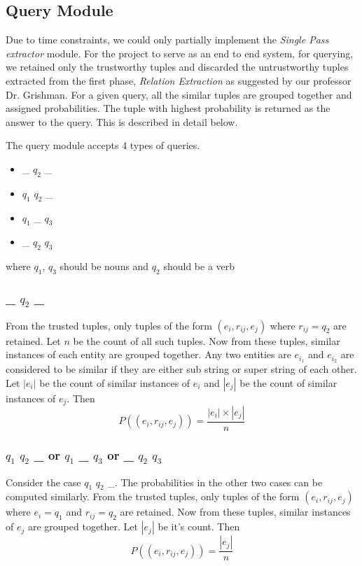 \documentclass{article}
\begin{document}
\subsection{Query Module}

Due to time constraints, we could only partially implement the \textit{Single Pass extractor} module. For the project to serve as an end to end system, for querying, we retained only the trustworthy tuples and discarded the untrustworthy tuples extracted from the first phase, \textit{Relation Extraction} as suggested by our professor Dr. Grishman. For a given query, all the similar tuples are grouped together and assigned probabilities. The tuple with highest probability is returned as the answer to the query. This is described in detail below. 

The query module accepts 4 types of queries.
\begin{itemize}
\item \_ $q_2$ \_
\item $q_1$ $q_2$ \_
\item $q_1$ \_ $q_3$
\item \_ $q_2$ $q_3$
\end{itemize}
where $q_1$, $q_3$ should be nouns and $q_2$ should be a verb
\subsubsection{\_ $q_2$ \_}

From the trusted tuples, only tuples of the form $(e_i, r_{ij}, e_j)$ where $r_{ij} = q_2$ are retained. Let $n$ be the count of all such tuples. Now from these tuples, similar instances of each entity are grouped together. Any two entities are $e_{i_1}$ and $e_{i_2}$ are considered to be similar if they are either sub string or super string of each other. Let $|e_i|$ be the count of similar instances of $e_i$ and $|e_j|$ be the count of similar instances of $e_j$. Then
\begin{equation*}
P((e_i, r_{ij}, e_j)) = \frac{|e_i| \times |e_j|}{n}
\end{equation*}  

\subsubsection{$q_1$ $q_2$ \_ or $q_1$ \_ $q_3$ or \_ $q_2$ $q_3$}

Consider the case $q_1$ $q_2$ \_. The probabilities in the other two cases can be computed similarly. From the trusted tuples, only tuples of the form $(e_i, r_{ij}, e_j)$ where $e_i = q_1$ and $r_{ij} = q_2$ are retained. Now from these tuples, similar instances of $e_j$ are grouped together. Let $|e_j|$ be it's count. Then
\begin{equation*}
P((e_i, r_{ij}, e_j)) = \frac{|e_j|}{n}
\end{equation*}
\end{document}

